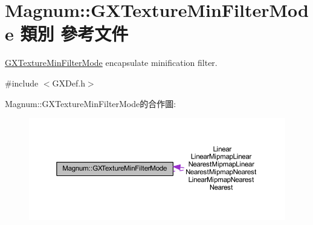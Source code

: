 \hypertarget{class_magnum_1_1_g_x_texture_min_filter_mode}{}\section{Magnum\+:\+:G\+X\+Texture\+Min\+Filter\+Mode 類別 參考文件}
\label{class_magnum_1_1_g_x_texture_min_filter_mode}


\hyperlink{class_magnum_1_1_g_x_texture_min_filter_mode}{G\+X\+Texture\+Min\+Filter\+Mode} encapsulate minification filter.  




{\ttfamily \#include $<$G\+X\+Def.\+h$>$}



Magnum\+:\+:G\+X\+Texture\+Min\+Filter\+Mode的合作圖\+:\nopagebreak
\begin{figure}[H]
\begin{center}
\leavevmode
\includegraphics[width=350pt]{class_magnum_1_1_g_x_texture_min_filter_mode__coll__graph}
\end{center}
\end{figure}
